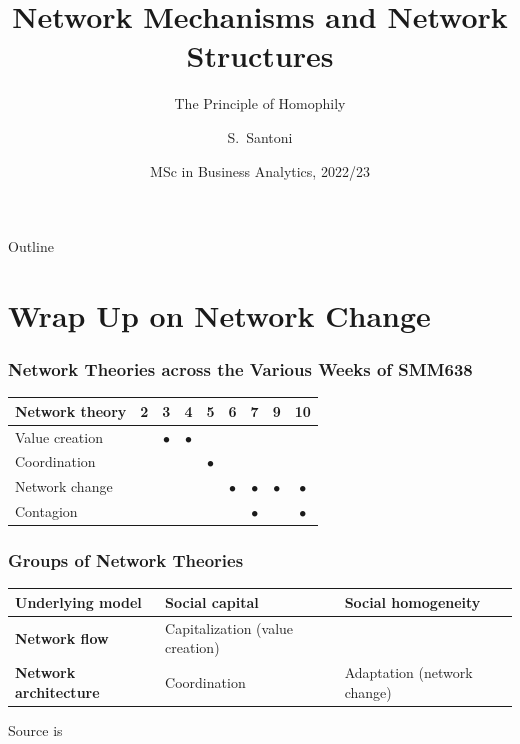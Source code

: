\documentclass[notes, aspectratio=1610]{beamer}
\title[Network Mechanisms]
{Network Mechanisms and Network Structures}
\subtitle{The Principle of Homophily}
\author{S.~Santoni\inst{1}\inst{2}}
\institute{
	\inst{1}%
	Bayes Business School
	\and
	\inst{2}%
	Soundcloud
	}
\date{MSc in Business Analytics, 2022/23}
\begin{document}
\begin{frame}
	\titlepage
\end{frame}

\begin{frame}{Outline}
	\tableofcontents
\end{frame}

\section{Wrap Up on Network Change}

\begin{frame}
	\frametitle{Network Theories across the Various Weeks of SMM638}
	\begin{table}
		\begin{tabular}[c]{l|c|c|c|c|c|c|c|c}
			\textbf{Network theory} & 
			\textbf{2} & 
			\textbf{3} & 
			\textbf{4} & 
			\textbf{5} & 
			\textbf{6} & 
			\textbf{7} & 
			\textbf{9} & 
			\textbf{10}\\
			\hline
			Value creation &  & $\bullet$ & $\bullet$ &  &  &  &  & \\	
			Coordination &  &  &  & $\bullet$ &  &  &  & \\	
			Network change &  &  &  &  & $\bullet$ & $\bullet$ & $\bullet$ & $\bullet$\\	
			Contagion &  &  &  &  &  & $\bullet$ &  & $\bullet$ \\	
		\end{tabular}
	\end{table}
\end{frame}

\begin{frame}
	\frametitle{Groups of Network Theories}
	\centering
	\small
	\begin{table}
		\begin{center}
			\begin{tabular}[c]{l|l|l}
				\textbf{Underlying model} & 
				\textbf{Social capital} &
				\textbf{Social homogeneity}\\
				\hline
				\textbf{Network flow} &
				Capitalization (value creation) & 
				\cellcolor{blue!20}{\color{black}{Contagion}}  \\
				\hline
				\textbf{Network architecture} & 
				Coordination & 
				Adaptation  (network change)\\
			\end{tabular}
		\end{center}
	\end{table}

	\vspace{1em}

	\raggedright \small Source is~\cite[][page 47]{scott2011}
\end{frame}
\end{document}
